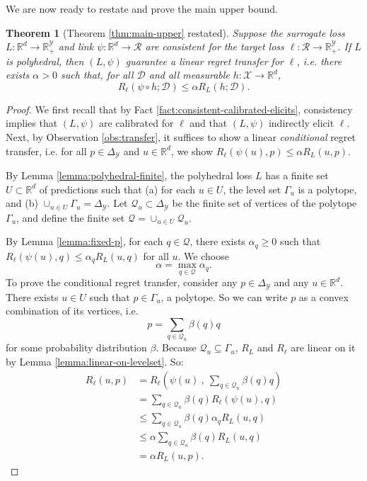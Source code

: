 \documentclass{article}
\newtheorem{theorem}{Theorem}
\theoremstyle{definition}\newtheorem{definition}{Definition}
\theoremstyle{definition}\newtheorem{assumption}{Assumption}
\newcommand{\reals}{\mathbb{R}}
\newcommand{\simplex}{\Delta_\Y}
\newcommand{\D}{\mathcal{D}}
\newcommand{\R}{\mathcal{R}}
\newcommand{\X}{\mathcal{X}}
\newcommand{\Y}{\mathcal{Y}}
\begin{document}
We are now ready to restate and prove the main upper bound.
\begin{theorem}[Theorem \ref{thm:main-upper} restated]
  Suppose the surrogate loss $L: \reals^d \to \reals_+^{\Y}$ and link $\psi: \reals^d \to \R$ are consistent for the target loss $\ell: \R \to \reals_+^{\Y}$.
  If $L$ is polyhedral, then $(L,\psi)$ guarantee a linear regret transfer for $\ell$, i.e. there exists $\alpha > 0$ such that, for all $\D$ and all measurable $h: \X \to \reals^d$,
    \[ R_{\ell}(\psi \circ h ; \D) \leq \alpha R_L(h ; \D) . \]
\end{theorem}
\begin{proof}
  We first recall that by Fact \ref{fact:consistent-calibrated-elicits}, consistency implies that $(L,\psi)$ are calibrated for $\ell$ and that $(L,\psi)$ indirectly elicit $\ell$.
  Next, by Observation \ref{obs:transfer}, it suffices to show a linear \emph{conditional} regret transfer, i.e. for all $p \in \simplex$ and $u \in \reals^d$, we show $R_{\ell}(\psi(u),p) \leq \alpha R_L(u,p)$.
  
  By Lemma \ref{lemma:polyhedral-finite}, the polyhedral loss $L$ has a finite set $U \subset \reals^d$ of predictions such that (a) for each $u \in U$, the level set $\Gamma_u$ is a polytope, and (b) $\cup_{u \in U} \Gamma_u = \simplex$.
  Let $\mathcal{Q}_u \subset \simplex$ be the finite set of vertices of the polytope $\Gamma_u$, and define the finite set $\mathcal{Q} = \cup_{u \in U} \mathcal{Q}_u$.
  
  By Lemma \ref{lemma:fixed-p}, for each $q \in \mathcal{Q}$, there exists $\alpha_q \geq 0$ such that $R_{\ell}(\psi(u),q) \leq \alpha_q R_L(u,q)$ for all $u$.
  We choose
    \[ \alpha = \max_{q \in \mathcal{Q}} \alpha_q . \]
  To prove the conditional regret transfer, consider any $p \in \simplex$ and any $u \in \reals^d$.
  There exists $u \in U$ such that $p \in \Gamma_u$, a polytope.
  So we can write $p$ as a convex combination of its vertices, i.e.
    \[ p = \sum_{q \in \mathcal{Q}_u} \beta(q) q \]
  for some probability distribution $\beta$.
  Because $\mathcal{Q}_u \subseteq \Gamma_u$, $R_L$ and $R_{\ell}$ are linear on it by Lemma \ref{lemma:linear-on-levelset}.
  So:
  \begin{align*}
    R_{\ell}(u,p)
    &=    R_{\ell}\left(\psi(u) ~,~ \sum_{q \in \mathcal{Q}_u} \beta(q) q\right)  \\
    &=    \sum_{q \in \mathcal{Q}_u} \beta(q) R_{\ell}(\psi(u),q)  \\
    &\leq \sum_{q \in \mathcal{Q}_u} \beta(q) \alpha_{q} R_L(u,q)  \\
    &\leq \alpha \sum_{q \in \mathcal{Q}_u} \beta(q) R_L(u,q)  \\
    &=    \alpha R_L(u, p) .
  \end{align*}
\end{proof}
\end{document}
